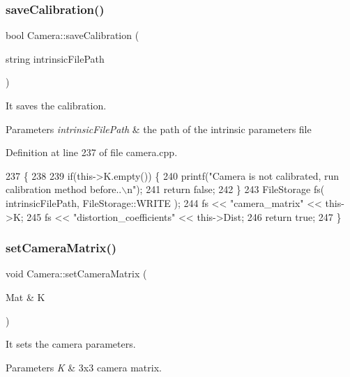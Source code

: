 \subsubsection{\texorpdfstring{save\+Calibration()}{saveCalibration()}}
{\footnotesize\ttfamily bool Camera\+::save\+Calibration (\begin{DoxyParamCaption}\item[{string}]{intrinsic\+File\+Path }\end{DoxyParamCaption})}



It saves the calibration. 


\begin{DoxyParams}{Parameters}
{\em intrinsic\+File\+Path} & the path of the intrinsic parameters file \\
\hline
\end{DoxyParams}


Definition at line 237 of file camera.\+cpp.


\begin{DoxyCode}
237                                                      \{
238   
239     \textcolor{keywordflow}{if}(this->K.empty()) \{
240         printf(\textcolor{stringliteral}{"Camera is not calibrated, run calibration method before..\(\backslash\)n"});
241         \textcolor{keywordflow}{return} \textcolor{keyword}{false};
242     \}
243    FileStorage fs( intrinsicFilePath, FileStorage::WRITE );
244     fs << \textcolor{stringliteral}{"camera\_matrix"} << this->K;
245     fs << \textcolor{stringliteral}{"distortion\_coefficients"} << this->Dist;
246    \textcolor{keywordflow}{return} \textcolor{keyword}{true};
247 \}
\end{DoxyCode}
\mbox{\label{classCamera_ab1d197f991bc02d373d8833f7da2e7eb}} 
\subsubsection{\texorpdfstring{set\+Camera\+Matrix()}{setCameraMatrix()}}
{\footnotesize\ttfamily void Camera\+::set\+Camera\+Matrix (\begin{DoxyParamCaption}\item[{Mat \&}]{K }\end{DoxyParamCaption})}



It sets the camera parameters. 


\begin{DoxyParams}{Parameters}
{\em K} & 3x3 camera matrix. \\
\hline
\end{DoxyParams}


